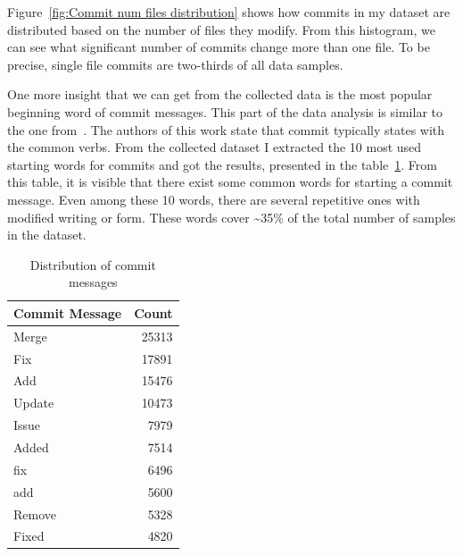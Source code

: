 Figure~{}\ref{fig:Commit num files distribution} shows how commits in my dataset are distributed based on the number of files they modify. From this histogram, we can see what significant number of commits change more than one file. To be precise, single file commits are two-thirds of all data samples. 

One more insight that we can get from the collected data is the most popular beginning word of commit messages. This part of the data analysis is similar to the one from~{}\cite{jung2021commitbert}. The authors of this work state that commit typically states with the common verbs. From the collected dataset I extracted the 10 most used starting words for commits and got the results, presented in the table~{}\ref{tab:commit_messages}. From this table, it is visible that there exist some common words for starting a commit message. Even among these 10 words, there are several repetitive ones with modified writing or form. These words cover \textasciitilde{}35\% of the total number of samples in the dataset.
\begin{table}[h]
    \centering
    \begin{tabular}{|l|r|} %
    \hline %
    \textbf{Commit Message} & \textbf{Count} \\ 
    \hline %
    Merge     & 25313 \\ \hline %
    Fix       & 17891 \\ \hline %
    Add       & 15476 \\ \hline %
    Update    & 10473 \\ \hline %
    Issue     & 7979  \\ \hline %
    Added     & 7514  \\ \hline %
    fix       & 6496  \\ \hline %
    add       & 5600  \\ \hline %
    Remove    & 5328  \\ \hline %
    Fixed     & 4820  \\ \hline %
    \end{tabular}
    \caption{Distribution of commit messages}\label{tab:commit_messages}
\end{table}

